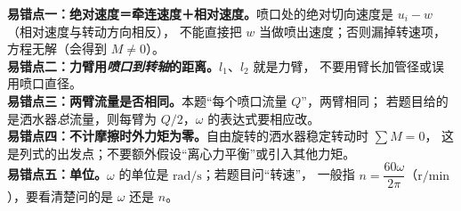 \begin{yicuo}
\textbf{易错点一：绝对速度＝牵连速度＋相对速度。}喷口处的绝对切向速度是 $u_i-w$（相对速度与转动方向相反），
不能直接把 $w$ 当做喷出速度；否则漏掉转速项，方程无解（会得到 $M\neq0$）。\\
\textbf{易错点二：力臂用\emph{喷口到转轴}的距离。}$l_1$、$l_2$ 就是力臂，
不要用臂长加管径或误用喷口直径。\\
\textbf{易错点三：两臂流量是否相同。}本题“每个喷口流量 $Q$”，两臂相同；
若题目给的是洒水器\emph{总}流量，则每臂为 $Q/2$，$\omega$ 的表达式要相应改。\\
\textbf{易错点四：不计摩擦时外力矩为零。}自由旋转的洒水器稳定转动时 $\sum M=0$，
这是列式的出发点；不要额外假设“离心力平衡”或引入其他力矩。\\
\textbf{易错点五：单位。}$\omega$ 的单位是 $\mathrm{rad/s}$；若题目问“转速”，
一般指 $n=\dfrac{60\omega}{2\pi}$（$\mathrm{r/min}$），要看清楚问的是 $\omega$ 还是 $n$。
\end{yicuo}
